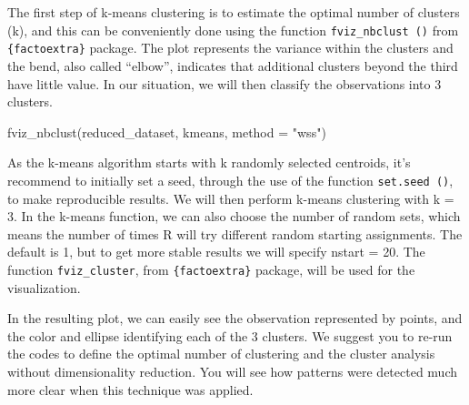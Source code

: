 \documentclass[
]{book}
\newenvironment{Shaded}{\begin{snugshade}}{\end{snugshade}}
\newcommand{\AttributeTok}[1]{\textcolor[rgb]{0.77,0.63,0.00}{#1}}
\newcommand{\ConstantTok}[1]{\textcolor[rgb]{0.00,0.00,0.00}{#1}}
\newcommand{\DecValTok}[1]{\textcolor[rgb]{0.00,0.00,0.81}{#1}}
\newcommand{\FunctionTok}[1]{\textcolor[rgb]{0.00,0.00,0.00}{#1}}
\newcommand{\NormalTok}[1]{#1}
\newcommand{\OtherTok}[1]{\textcolor[rgb]{0.56,0.35,0.01}{#1}}
\newcommand{\SpecialCharTok}[1]{\textcolor[rgb]{0.00,0.00,0.00}{#1}}
\newcommand{\StringTok}[1]{\textcolor[rgb]{0.31,0.60,0.02}{#1}}
\begin{document}
The first step of k-means clustering is to estimate the optimal number of clusters (k), and this can be conveniently done using the function \texttt{fviz\_nbclust\ ()} from \texttt{\{factoextra\}} package. The plot represents the variance within the clusters and the bend, also called ``elbow'', indicates that additional clusters beyond the third have little value. In our situation, we will then classify the observations into 3 clusters.

\begin{Shaded}
\begin{Highlighting}[]
\FunctionTok{fviz\_nbclust}\NormalTok{(reduced\_dataset, kmeans, }\AttributeTok{method =} \StringTok{"wss"}\NormalTok{)}
\end{Highlighting}
\end{Shaded}

As the k-means algorithm starts with k randomly selected centroids, it's recommend to initially set a seed, through the use of the function \texttt{set.seed\ ()}, to make reproducible results. We will then perform k-means clustering with k = 3. In the k-means function, we can also choose the number of random sets, which means the number of times R will try different random starting assignments. The default is 1, but to get more stable results we will specify nstart = 20. The function \texttt{fviz\_cluster}, from \texttt{\{factoextra\}} package, will be used for the visualization.

\begin{Shaded}
\end{Shaded}

In the resulting plot, we can easily see the observation represented by points, and the color and ellipse identifying each of the 3 clusters. We suggest you to re-run the codes to define the optimal number of clustering and the cluster analysis without dimensionality reduction. You will see how patterns were detected much more clear when this technique was applied.
\end{document}

